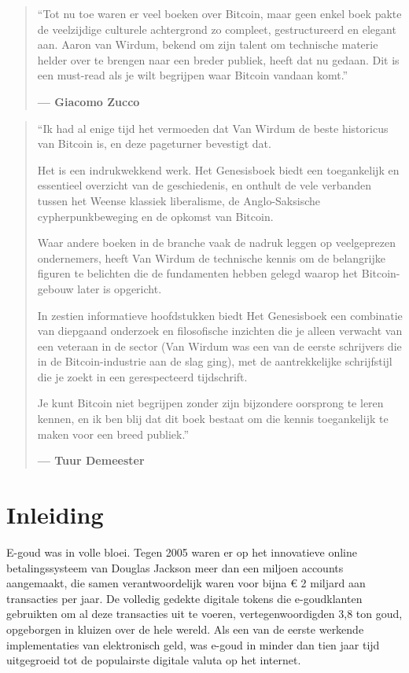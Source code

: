 \documentclass[
  a5paper,
  smalldemyvopaper,11pt,twoside,onecolumn,openright,extrafontsizes]{memoir}
\begin{document}
\begin{quote}
``Tot nu toe waren er veel boeken over Bitcoin, maar geen enkel boek
pakte de veelzijdige culturele achtergrond zo compleet, gestructureerd
en elegant aan. Aaron van Wirdum, bekend om zijn talent om technische
materie helder over te brengen naar een breder publiek, heeft dat nu
gedaan. Dit is een must-read als je wilt begrijpen waar Bitcoin vandaan
komt.''

\textbf{--- Giacomo Zucco}
\end{quote}

\begin{quote}
``Ik had al enige tijd het vermoeden dat Van Wirdum de beste historicus
van Bitcoin is, en deze pageturner bevestigt dat.

Het is een indrukwekkend werk. Het Genesisboek biedt een toegankelijk en
essentieel overzicht van de geschiedenis, en onthult de vele verbanden
tussen het Weense klassiek liberalisme, de Anglo-Saksische
cypherpunkbeweging en de opkomst van Bitcoin.

Waar andere boeken in de branche vaak de nadruk leggen op veelgeprezen
ondernemers, heeft Van Wirdum de technische kennis om de belangrijke
figuren te belichten die de fundamenten hebben gelegd waarop het
Bitcoin-gebouw later is opgericht.

In zestien informatieve hoofdstukken biedt Het Genesisboek een
combinatie van diepgaand onderzoek en filosofische inzichten die je
alleen verwacht van een veteraan in de sector (Van Wirdum was een van de
eerste schrijvers die in de Bitcoin-industrie aan de slag ging), met de
aantrekkelijke schrijfstijl die je zoekt in een gerespecteerd
tijdschrift.

Je kunt Bitcoin niet begrijpen zonder zijn bijzondere oorsprong te leren
kennen, en ik ben blij dat dit boek bestaat om die kennis toegankelijk
te maken voor een breed publiek.''

\textbf{--- Tuur Demeester}
\end{quote}


\chapter*{Inleiding}\label{inleiding}


E-goud was in volle bloei. Tegen 2005 waren er op het innovatieve online
betalingssysteem van Douglas Jackson meer dan een miljoen accounts
aangemaakt, die samen verantwoordelijk waren voor bijna € 2 miljard aan
transacties per jaar. De volledig gedekte digitale tokens die
e-goudklanten gebruikten om al deze transacties uit te voeren,
vertegenwoordigden 3,8 ton goud, opgeborgen in kluizen over de hele
wereld. Als een van de eerste werkende implementaties van elektronisch
geld, was e-goud in minder dan tien jaar tijd uitgegroeid tot de
populairste digitale valuta op het internet.
\end{document}

